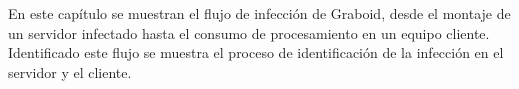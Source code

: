 \documentclass[../main/main.tex]{subfiles}
\begin{document}
\espacio
  En este capítulo se muestran el flujo de infección de Graboid, desde el montaje de un servidor infectado hasta el consumo de procesamiento en un equipo cliente. Identificado este flujo se muestra el proceso de identificación de la infección en el servidor y el cliente.
\end{document}
